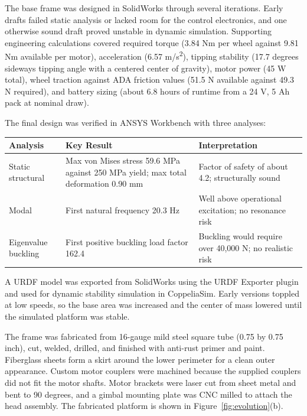 \documentclass[11pt,a4paper]{article}
\begin{document}
The base frame was designed in SolidWorks through several iterations. Early drafts failed static analysis or lacked room for the control electronics, and one otherwise sound draft proved unstable in dynamic simulation. Supporting engineering calculations covered required torque (3.84 Nm per wheel against 9.81 Nm available per motor), acceleration (6.57 m/s\textsuperscript{2}), tipping stability (17.7 degrees sideways tipping angle with a centered center of gravity), motor power (45 W total), wheel traction against ADA friction values (51.5 N available against 49.3 N required), and battery sizing (about 6.8 hours of runtime from a 24 V, 5 Ah pack at nominal draw).

The final design was verified in ANSYS Workbench with three analyses:

\begin{table}[H]
\centering
\begin{tabular}{@{}L{3.2cm}L{5.8cm}L{5.2cm}@{}}
\toprule
\textbf{Analysis} & \textbf{Key Result} & \textbf{Interpretation} \\
\midrule
Static structural & Max von Mises stress 59.6 MPa against 250 MPa yield; max total deformation 0.90 mm & Factor of safety of about 4.2; structurally sound \\
Modal & First natural frequency 20.3 Hz & Well above operational excitation; no resonance risk \\
Eigenvalue buckling & First positive buckling load factor 162.4 & Buckling would require over 40,000 N; no realistic risk \\
\bottomrule
\end{tabular}
\end{table}

A URDF model was exported from SolidWorks using the URDF Exporter plugin and used for dynamic stability simulation in CoppeliaSim. Early versions toppled at low speeds, so the base area was increased and the center of mass lowered until the simulated platform was stable.

The frame was fabricated from 16-gauge mild steel square tube (0.75 by 0.75 inch), cut, welded, drilled, and finished with anti-rust primer and paint. Fiberglass sheets form a skirt around the lower perimeter for a clean outer appearance. Custom motor couplers were machined because the supplied couplers did not fit the motor shafts. Motor brackets were laser cut from sheet metal and bent to 90 degrees, and a gimbal mounting plate was CNC milled to attach the head assembly. The fabricated platform is shown in Figure~\ref{fig:evolution}(b).
\end{document}
